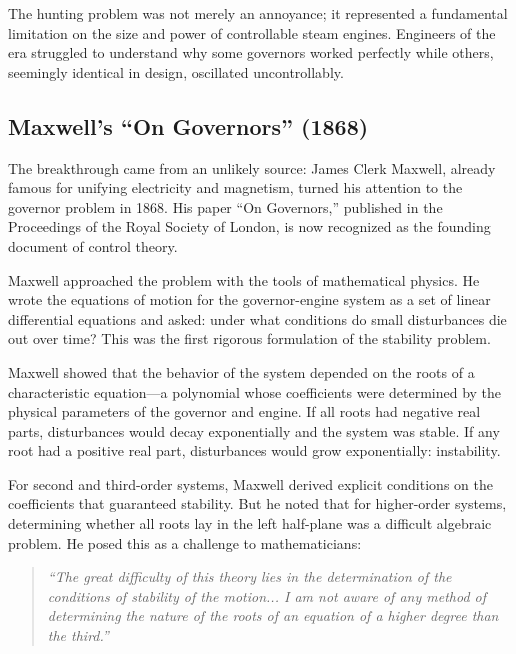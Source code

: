 The hunting problem was not merely an annoyance; it represented a fundamental limitation on the size and power of controllable steam engines. Engineers of the era struggled to understand why some governors worked perfectly while others, seemingly identical in design, oscillated uncontrollably.

\subsection{Maxwell's ``On Governors'' (1868)}

\begin{historicalbox}
The breakthrough came from an unlikely source: James Clerk Maxwell, already famous for unifying electricity and magnetism, turned his attention to the governor problem in 1868. His paper ``On Governors,'' published in the Proceedings of the Royal Society of London, is now recognized as the founding document of control theory.

Maxwell approached the problem with the tools of mathematical physics. He wrote the equations of motion for the governor-engine system as a set of linear differential equations and asked: under what conditions do small disturbances die out over time? This was the first rigorous formulation of the stability problem.

Maxwell showed that the behavior of the system depended on the roots of a characteristic equation---a polynomial whose coefficients were determined by the physical parameters of the governor and engine. If all roots had negative real parts, disturbances would decay exponentially and the system was stable. If any root had a positive real part, disturbances would grow exponentially: instability.

For second and third-order systems, Maxwell derived explicit conditions on the coefficients that guaranteed stability. But he noted that for higher-order systems, determining whether all roots lay in the left half-plane was a difficult algebraic problem. He posed this as a challenge to mathematicians:

\begin{quote}
\textit{``The great difficulty of this theory lies in the determination of the conditions of stability of the motion... I am not aware of any method of determining the nature of the roots of an equation of a higher degree than the third.''}
\end{quote}
\end{historicalbox}


